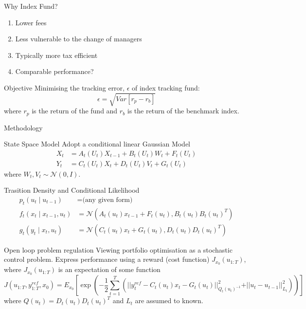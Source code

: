 \documentclass[handout]{beamer}
\begin{document}
\begin{frame}{Why Index Fund?}
   \begin{enumerate}
\item Lower fees
\item Less vulnerable to the change of managers
\item Typically more tax efficient
\item Comparable performance?
   \end{enumerate}
\begin{block}{Objective}
Minimising the tracking error, $\epsilon$ of index tracking fund:
\begin{equation}
\epsilon = \sqrt{Var[r_p - r_b]}
\end{equation}
where $r_p$ is the return of the fund and $r_b$ is the return of the benchmark index.
\end{block}
\end{frame}

\begin{frame}{Methodology}
\begin{block}{State Space Model}
Adopt a conditional linear Gaussian Model
\begin{align*}
  X_t &= A_t(U_t)X_{t-1} + B_t(U_t)W_t + F_t(U_t) \nonumber \\
  Y_t &= C_t(U_t)X_t + D_t(U_t)V_t + G_t(U_t)
\label{eq:model}
\end{align*}
where $W_t, V_t \sim \mathcal{N}(0,I)$.
\end{block}

\begin{block}{Trasition Density and Conditional Likelihood}
\begin{align}
  p_t(u_t \mid u_{t-1}) &= \textrm{(any given form)} \nonumber \\
  f_t(x_t \mid x_{t-1}, u_t) &= \mathcal{N}(A_t(u_t) x_{t-1} + F_t(u_t), B_t(u_t)B_t(u_t)^T) \nonumber \\
  g_t(y_t \mid x_t, u_t)    &= \mathcal{N}(C_t(u_t) x_t + G_t(u_t), D_t(u_t)D_t(u_t)^T)
\end{align}
\end{block}
\end{frame}

\begin{frame}
\begin{block}{Open loop problem regulation}
Viewing portfolio optimisation as a stochastic control problem.
Express performance using a reward (cost function) $J_{x_0}(u_{1:T})$, where $J_{x_0}(u_{1:T})$ is an expectation of some function
\begin{equation}
  J(u_{1:T},y^{ref}_{1:T}, x_0) =E_{x_0}\left[\exp\left( -\dfrac{1}{2}\displaystyle\sum^T_{t=1}\left(\vert\vert y^{ref}_t - C_t(u_t)x_t - G_t(u_t) \vert\vert^2_{Q_t(u_t)^{-1}}  + \vert\vert u_t - u_{t-1} \vert\vert^2_{L_t}\right) \right) \right]
\end{equation}
where $Q(u_t) = D_t(u_t)D_t(u_t)^T$ and $L_t$ are assumed to known.
\end{block}
\end{frame}
\end{document}
